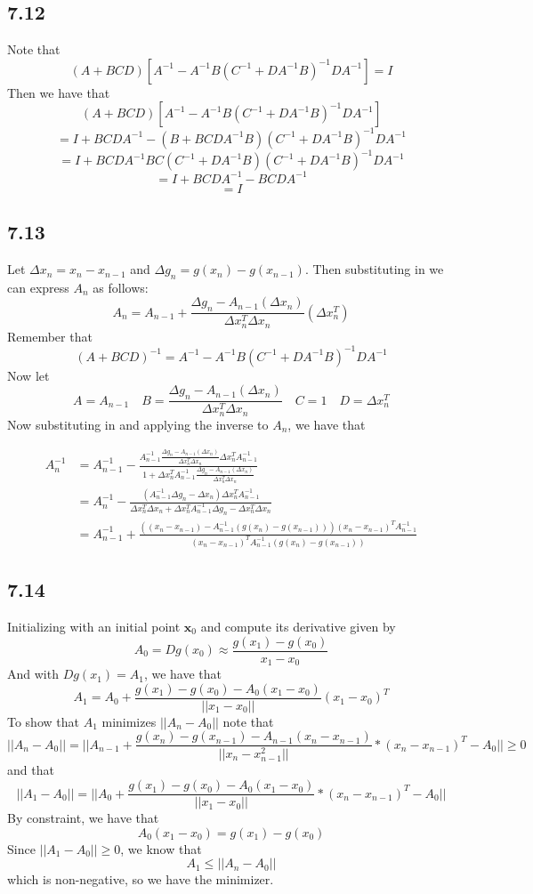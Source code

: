 \documentclass[letterpaper,12pt]{article}
\theoremstyle{definition}
\begin{document}
\subsection*{7.12}


Note that 
\[(A+BCD)[A^{-1}-A^{-1}B(C^{-1}+DA^{-1}B)^{-1}DA^{-1}]=I\]
Then we have that
\[(A+BCD)[A^{-1}-A^{-1}B(C^{-1}+DA^{-1}B)^{-1}DA^{-1}]\]
\[=I+BCDA^{-1}-(B+BCDA^{-1}B)(C^{-1}+DA^{-1}B)^{-1}DA^{-1}\]
\[=I+BCDA^{-1}BC(C^{-1}+DA^{-1}B)(C^{-1}+DA^{-1}B)^{-1}DA^{-1}\]
\[=I+BCDA^{-1}-BCDA^{-1}\]
\[=I\]



\subsection*{7.13}
Let $\Delta x_n = x_n - x_{n-1}$ and $\Delta g_n = g(x_n)-g(x_{n-1})$. Then substituting in we can express $A_n$ as follows: 
\[ A_n = A_{n-1} + \frac{\Delta g_n - A_{n-1}(\Delta x_n)}{\Delta x_n^T\Delta x_n}(\Delta x_n^T) \]
Remember that
\[ (A+BCD)^{-1} = A^{-1}-A^{-1}B(C^{-1}+DA^{-1}B)^{-1}DA^{-1} \] 
Now let \[A=A_{n-1}\quad B=\frac{\Delta g_n - A_{n-1}(\Delta x_n)}{\Delta x_n^T \Delta x_n} \quad C=1 \quad D=\Delta x_n^T\]
Now substituting in and applying the inverse to $A_n$, we have that

\begin{align*}
A_n^{-1} &= A_{n-1}^{-1} - \frac{A_{n-1}^{-1}\frac{\Delta g_n - A_{n-1}(\Delta x_n)}{\Delta x_n^T \Delta x_n}\Delta x_n^T A_{n-1}^{-1}}{1+\Delta x_n^T A_{n-1}^{-1}\frac{\Delta g_n - A_{n-1}(\Delta x_n)}{\Delta x_n^T \Delta x_n}} \\
&= A_n^{-1} - \frac{(A_{n-1}^{-1}\Delta g_n - \Delta x_n)\Delta x_n^T A_{n-1}^{-1}}{\Delta x_n^T \Delta x_n + \Delta x_n^T A_{n-1}^{-1}\Delta g_n - \Delta x_n^T \Delta x_n}\\
&= A_{n-1}^{-1} + \frac{((x_n - x_{n-1})-A_{n-1}^{-1}(g(x_n)-g(x_{n-1})))(x_n-x_{n-1})^TA_{n-1}^{-1}}{(x_n-x_{n-1})^TA_{n-1}^{-1}(g(x_n)-g(x_{n-1}))}
\end{align*}

\subsection*{7.14}


Initializing with an initial point $\mathbf{x}_0$ and compute its derivative given by 
\[A_0 = Dg(x_0) \approx  \frac{g(x_1)-g(x_0)}{x_1-x_0}\]
And with $Dg(x_1) = A_1$, we have that
\[A_1 = A_0 + \frac{g(x_1)-g(x_0)-A_0(x_1-x_0)}{||x_1-x_0||} (x_1 - x_0)^T\]
To show that $A_1$ minimizes $||A_n - A_0||$ note that 
\\ \[||A_n-A_0|| = ||A_{n-1}+\frac{g(x_n)-g(x_{n-1})-A_{n-1}(x_n - x_{n-1})}{||x_n - x_{n-1}^2||} * (x_n - x_{n-1})^T - A_0 || \geq 0\]
and that
\[||A_1 - A_0|| = ||A_0 + \frac{g(x_1)-g(x_0)-A_0(x_1-x_0)}{||x_1-x_0||}*(x_n - x_{n-1})^T-A_0||\]
By constraint, we have that \[A_0(x_1-x_0) =  g(x_1) - g(x_0)\] 
Since $||A_1 - A_0|| \geq 0$, we know that 
\[ A_1 \leq ||A_n - A_0|| \]
which is non-negative, so we have the minimizer.
\end{document}
